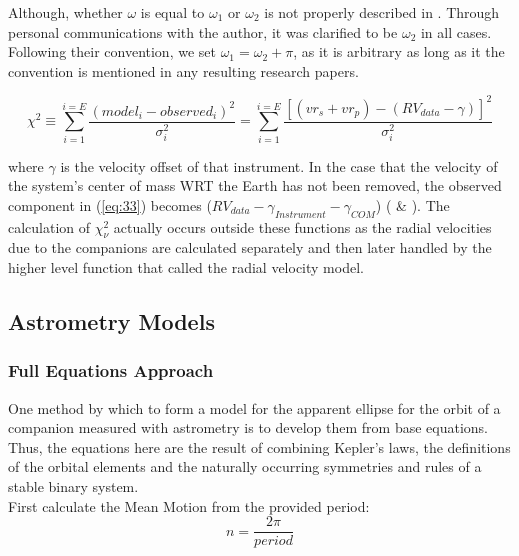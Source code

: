 \documentclass[10pt,preprint]{aastex}
\begin{document}
Although, whether $\omega$ is equal to $\omega_1$ or $\omega_2$ is not properly described in \citet{Shulze-Hartung}.  Through personal communications with the author, it was clarified to be $\omega_2$ in all cases.  Following their convention, we set $\omega_1 = \omega_2+\pi$, as it is arbitrary as long as it the convention is mentioned in any resulting research papers.

\begin{equation}\label{eq:33}
{\chi}^{2} \equiv  \sum_{i=1}^{i=E} \frac{(model_i - observed_i)^{2}}{\sigma^{2}_i} = \sum_{i=1}^{i=E} \frac{[(vr_s+vr_p) - (RV_{data}-\gamma)]^{2}}{\sigma^{2}_i}
\end{equation}

where $\gamma $ is the velocity offset of that instrument.  In the case that the velocity of the system's center of mass WRT the Earth has not been removed, the observed component in (\ref{eq:33}) becomes ($RV_{data}-\gamma_{Instrument}-\gamma_{COM}$) (\citet{Paddock} \& \citet{Shulze-Hartung}).  The calculation of $\chi^{2}_{\nu}$ actually occurs outside these functions as the radial velocities due to the companions are calculated separately and then later handled by the higher level function that called the radial velocity model.


\subsection{Astrometry Models}\label{sec:DI-OrbModels}

\subsubsection{Full Equations Approach}

One method by which to form a model for the apparent ellipse for the orbit of a companion measured with astrometry is to develop them from base equations.  Thus, the equations here are the result of combining Kepler's laws, the definitions of the orbital elements and the naturally occurring symmetries and rules of a stable binary system.\\

First calculate the Mean Motion from the provided period:
\begin{equation}\label{eq:4.1.1}
n = \frac{2\pi}{period} 
\end{equation}
\end{document}
